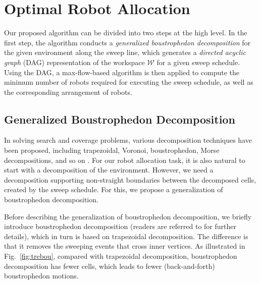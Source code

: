 
\section{Optimal Robot Allocation}


Our proposed algorithm can be divided into two steps at the high level. 
In the first step, the algorithm conducts a \emph{generalized boustrophedon 
decomposition} for the given environment along the sweep line, 
which generates a \textit{directed acyclic graph} (DAG) representation 
of the workspace $\mathcal W$ for a given sweep schedule. 
Using the DAG, a max-flow-based algorithm is then applied to compute the 
minimum number of robots required for executing the sweep schedule, 
as well as the corresponding arrangement of robots.

\subsection{Generalized Boustrophedon Decomposition}
In solving search and coverage problems, various decomposition techniques 
have been proposed, including trapezoidal, Voronoi, boustrophedon, Morse decompositions, 
and so on \cite{huang2001optimal, choset2000coverage, breitenmoser2010voronoi, acar2002morse}.
For our robot allocation task, it is also natural to start with a decomposition 
of the environment. 
However, we need a decomposition supporting non-straight 
boundaries between the decomposed cells, created by the sweep schedule. 
For this, we propose a generalization of boustrophedon decomposition. 

Before describing the generalization of boustrophedon decomposition, 
we briefly introduce boustrophedon decomposition (readers are referred to 
\cite{choset2000coverage} for further details), which in turn is based on 
trapezoidal decomposition. The difference is that it removes the sweeping 
events that cross inner vertices. As illustrated in Fig.~\ref{fig:trebou},
compared with trapezoidal decomposition, boustrophedon decomposition 
has fewer cells, which leads to fewer (back-and-forth) boustrophedon motions.

